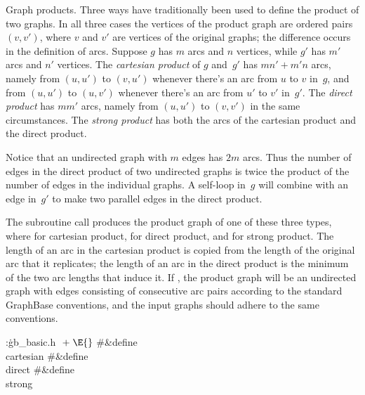 Graph products. Three ways have traditionally been used to define the
product of two graphs. In all three cases the vertices of the product graph
are ordered pairs $(v,v')$, where $v$ and $v'$ are vertices of the original
graphs; the difference occurs in the definition of arcs. Suppose $g$ has
$m$ arcs and $n$ vertices, while $g'$ has $m'$ arcs and $n'$ vertices. The
{\sl cartesian product\/} of $g$ and~$g'$ has $mn'+m'n$ arcs, namely from
$(u,u')$ to $(v,u')$ whenever there's an arc from $u$ to $v$ in~$g$, and from
$(u,u')$ to $(u,v')$ whenever there's an arc from $u'$ to $v'$ in~$g'$.
The {\sl direct product\/} has $mm'$ arcs, namely from $(u,u')$ to
$(v,v')$ in the same circumstances. The {\sl strong product\/}
has both the arcs of the cartesian product and the direct product.

Notice that an undirected graph with $m$ edges has $2m$ arcs. Thus the
number of edges in the direct product of two undirected graphs is
twice the product of the number of edges in the individual graphs.
A self-loop in~$g$ will combine with an edge in~$g'$ to make
two parallel edges in the direct product.

The subroutine call 
produces the product
graph of one of these three types, where  for cartesian
product,
 for direct product, and  for
strong product.
The length of an arc in the cartesian product is copied from the length
of the original arc that it replicates; the length of an arc in the direct
product is the minimum of the two arc lengths that induce it. If ,
the product graph will be an undirected graph with edges consisting
of consecutive arc pairs according to the standard GraphBase conventions,
and the input graphs should adhere to  the same conventions.

\Y\B\4:\.{gb\_basic.h }\X${}\mathrel+\E{}$\6
\8\#\&{define} \\{cartesian} \5\6
\8\#\&{define} \\{direct} \5\6
\8\#\&{define} \\{strong} \5\par
\fi

